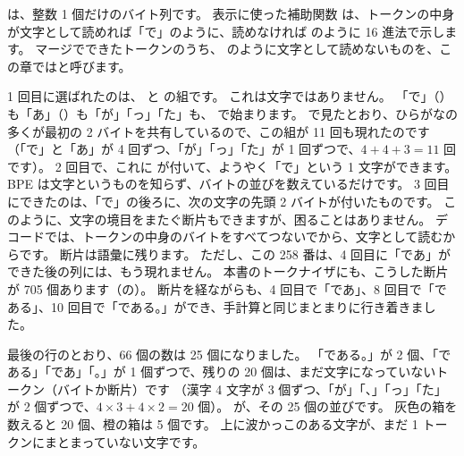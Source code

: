 
 は、整数  1 個だけのバイト列です。
表示に使った補助関数  は、トークンの中身が文字として読めれば「で」のように、読めなければ  のように 16 進法で示します。
マージでできたトークンのうち、 のように文字として読めないものを、この章ではと呼びます。

1 回目に選ばれたのは、 と  の組です。
これは文字ではありません。
「で」（）も「あ」（）も「が」「っ」「た」も、 で始まります。
で見たとおり、ひらがなの多くが最初の 2 バイトを共有しているので、この組が 11 回も現れたのです
（「で」と「あ」が 4 回ずつ、「が」「っ」「た」が 1 回ずつで、$4+4+3=11$ 回です）。
2 回目で、これに  が付いて、ようやく「で」という 1 文字ができます。
BPE は文字というものを知らず、バイトの並びを数えているだけです。
3 回目にできたのは、「で」の後ろに、次の文字の先頭 2 バイトが付いたものです。
このように、文字の境目をまたぐ断片もできますが、困ることはありません。
デコードでは、トークンの中身のバイトをすべてつないでから、文字として読むからです。
断片は語彙に残ります。
ただし、この 258 番は、4 回目に「であ」ができた後の列には、もう現れません。
本書のトークナイザにも、こうした断片が 705 個あります（の）。
断片を経ながらも、4 回目で「であ」、8 回目で「である」、10 回目で「である。」ができ、手計算と同じまとまりに行き着きました。

最後の行のとおり、66 個の数は 25 個になりました。
「である。」が 2 個、「である」「であ」「。」が 1 個ずつで、残りの 20 個は、まだ文字になっていないトークン（バイトか断片）です
（漢字 4 文字が 3 個ずつ、「が」「、」「っ」「た」が 2 個ずつで、$4\times3+4\times2=20$ 個）。
が、その 25 個の並びです。
灰色の箱を数えると 20 個、橙の箱は 5 個です。
上に波かっこのある文字が、まだ 1 トークンにまとまっていない文字です。

